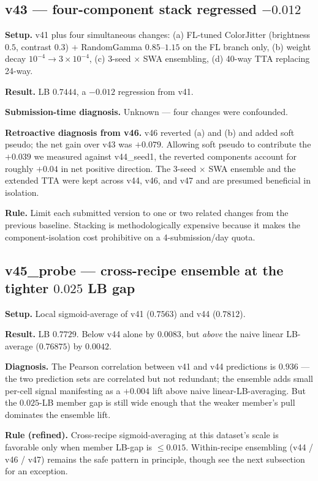 \documentclass[conference]{IEEEtran}
\begin{document}
\subsection{v43 --- four-component stack regressed $-0.012$}

\textbf{Setup.} v41 plus four simultaneous changes: (a) FL-tuned ColorJitter (brightness $0.5$, contrast $0.3$) $+$ RandomGamma $0.85$--$1.15$ on the FL branch only, (b) weight decay $10^{-4} \rightarrow 3\times 10^{-4}$, (c) 3-seed $\times$ SWA ensembling, (d) 40-way TTA replacing 24-way.

\textbf{Result.} LB $0.7444$, a $-0.012$ regression from v41.

\textbf{Submission-time diagnosis.} Unknown --- four changes were confounded.

\textbf{Retroactive diagnosis from v46.} v46 reverted (a) and (b) and added soft pseudo; the net gain over v43 was $+0.079$. Allowing soft pseudo to contribute the $+0.039$ we measured against v44\_seed1, the reverted components account for roughly $+0.04$ in net positive direction. The 3-seed $\times$ SWA ensemble and the extended TTA were kept across v44, v46, and v47 and are presumed beneficial in isolation.

\textbf{Rule.} Limit each submitted version to one or two related changes from the previous baseline. Stacking is methodologically expensive because it makes the component-isolation cost prohibitive on a 4-submission/day quota.

\subsection{v45\_probe --- cross-recipe ensemble at the tighter $0.025$ LB gap}

\textbf{Setup.} Local sigmoid-average of v41 ($0.7563$) and v44 ($0.7812$).

\textbf{Result.} LB $0.7729$. Below v44 alone by $0.0083$, but \emph{above} the naive linear LB-average ($0.76875$) by $0.0042$.

\textbf{Diagnosis.} The Pearson correlation between v41 and v44 predictions is $0.936$ --- the two prediction sets are correlated but not redundant; the ensemble adds small per-cell signal manifesting as a $+0.004$ lift above naive linear-LB-averaging. But the $0.025$-LB member gap is still wide enough that the weaker member's pull dominates the ensemble lift.

\textbf{Rule (refined).} Cross-recipe sigmoid-averaging at this dataset's scale is favorable only when member LB-gap is $\le 0.015$. Within-recipe ensembling (v44 / v46 / v47) remains the safe pattern in principle, though see the next subsection for an exception.
\end{document}
